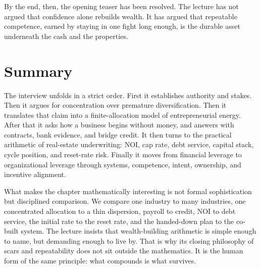 By the end, then, the opening teaser has been resolved. The lecture has not argued that confidence alone rebuilds wealth. It has argued that repeatable competence, earned by staying in one fight long enough, is the durable asset underneath the cash and the properties.

\section{Summary}

The interview unfolds in a strict order. First it establishes authority and stakes. Then it argues for concentration over premature diversification. Then it translates that claim into a finite-allocation model of entrepreneurial energy. After that it asks how a business begins without money, and answers with contracts, bank evidence, and bridge credit. It then turns to the practical arithmetic of real-estate underwriting: \(\mathrm{NOI}\), cap rate, debt service, capital stack, cycle position, and reset-rate risk. Finally it moves from financial leverage to organizational leverage through systems, competence, intent, ownership, and incentive alignment.

What makes the chapter mathematically interesting is not formal sophistication but disciplined comparison. We compare one industry to many industries, one concentrated allocation to a thin dispersion, payroll to credit, \(\mathrm{NOI}\) to debt service, the initial rate to the reset rate, and the handed-down plan to the co-built system. The lecture insists that wealth-building arithmetic is simple enough to name, but demanding enough to live by. That is why its closing philosophy of scars and repeatability does not sit outside the mathematics. It is the human form of the same principle: what compounds is what survives.